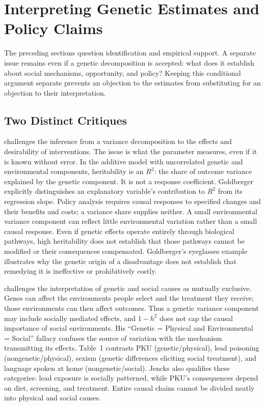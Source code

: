 \section{Interpreting Genetic Estimates and Policy Claims}
\label{sec:interpretation}
The preceding sections question identification and empirical support.
A separate issue remains even if a genetic decomposition is accepted:
what does it establish about social mechanisms, opportunity, and policy?
Keeping this conditional argument separate prevents an objection to the
estimates from substituting for an objection to their interpretation.

\subsection{Two Distinct Critiques}

\citet[pp.~344--346]{Goldberger1979} challenges the inference from a
variance decomposition to the effects and desirability of interventions.
The issue is what the parameter measures, even if it is known without
error. In the additive model with uncorrelated genetic and environmental
components, heritability is an $R^2$: the share of outcome variance
explained by the genetic component. It is not a response coefficient.
Goldberger explicitly distinguishes an explanatory variable's
contribution to $R^2$ from its regression slope. Policy analysis requires
causal responses to specified changes and their benefits and costs;
a variance share supplies neither. A small environmental variance component
can reflect little environmental variation rather than a small causal
response. Even if genetic effects operate entirely through biological
pathways, high heritability does not establish that those pathways cannot
be modified or their consequences compensated. Goldberger's eyeglasses
example illustrates why the genetic origin of a disadvantage does not
establish that remedying it is ineffective or prohibitively costly.

\citet[pp.~729--734]{Jencks1980} challenges the interpretation of genetic
and social causes as mutually exclusive. Genes can affect the environments
people select and the treatment they receive; those environments can then
affect outcomes. Thus a genetic variance component may include socially
mediated effects, and $1-h^2$ does not cap the causal importance of social
environments. His ``Genetic = Physical and Environmental = Social''
fallacy confuses the source of variation with the mechanism transmitting
its effects. Table~1 contrasts PKU (genetic/physical), lead poisoning
(nongenetic/physical), sexism (genetic differences eliciting social
treatment), and language spoken at home (nongenetic/social). Jencks also
qualifies these categories: lead exposure is socially patterned, while
PKU's consequences depend on diet, screening, and treatment. Entire
causal chains cannot be divided neatly into physical and social causes.

